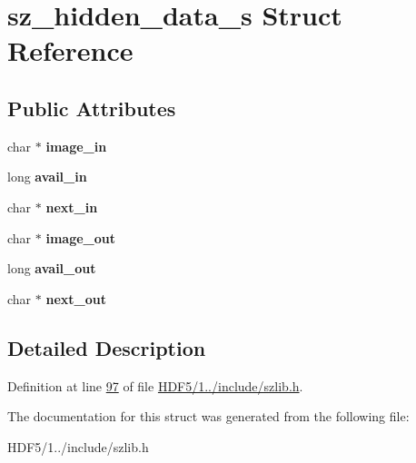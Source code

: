 \hypertarget{structsz__hidden__data__s}{}\section{sz\+\_\+hidden\+\_\+data\+\_\+s Struct Reference}
\label{structsz__hidden__data__s}
\subsection*{Public Attributes}
\begin{DoxyCompactItemize}
\item 
\mbox{\label{structsz__hidden__data__s_a5c97d7bb02d19c84560acf839b8b6e31}} 
char $\ast$ {\bfseries image\+\_\+in}
\item 
\mbox{\label{structsz__hidden__data__s_a0140ec0b337668599d3106bb6aade8e0}} 
long {\bfseries avail\+\_\+in}
\item 
\mbox{\label{structsz__hidden__data__s_afa3f356d9462692614c621bb36b6378f}} 
char $\ast$ {\bfseries next\+\_\+in}
\item 
\mbox{\label{structsz__hidden__data__s_a45b22efa738f77846955d82e9c18ae4b}} 
char $\ast$ {\bfseries image\+\_\+out}
\item 
\mbox{\label{structsz__hidden__data__s_a06541292688a142115ea2fbb0c7f02e1}} 
long {\bfseries avail\+\_\+out}
\item 
\mbox{\label{structsz__hidden__data__s_a8a866df99e7af704424118f5f7582667}} 
char $\ast$ {\bfseries next\+\_\+out}
\end{DoxyCompactItemize}


\subsection{Detailed Description}


Definition at line \hyperlink{_h_d_f5_21_810_81_2include_2szlib_8h_source_l00097}{97} of file \hyperlink{_h_d_f5_21_810_81_2include_2szlib_8h_source}{H\+D\+F5/1../include/szlib.\+h}.



The documentation for this struct was generated from the following file\+:\begin{DoxyCompactItemize}
\item 
H\+D\+F5/1../include/szlib.\+h\end{DoxyCompactItemize}
